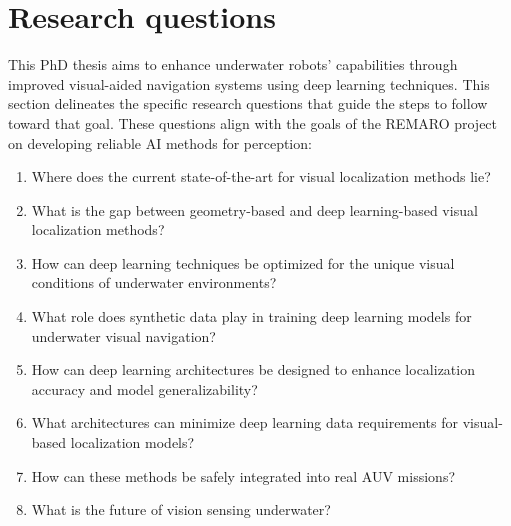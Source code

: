 \section{Research questions}
\label{sec:intro:researchquestions}

This PhD thesis aims to enhance underwater robots' capabilities through improved visual-aided navigation systems using deep learning techniques. This section delineates the specific research questions that guide the steps to follow toward that goal. These questions align with the goals of the REMARO project on developing reliable AI methods for perception:
\begin{enumerate}
    \item Where does the current state-of-the-art for visual localization methods lie?
    \item What is the gap between geometry-based and deep learning-based visual localization methods?
    \item How can deep learning techniques be optimized for the unique visual conditions of underwater environments?
    \item What role does synthetic data play in training deep learning models for underwater visual navigation?
    \item How can deep learning architectures be designed to enhance localization accuracy and model generalizability?
    \item What architectures can minimize deep learning data requirements for visual-based localization models?
    \item How can these methods be safely integrated into real AUV missions?
    \item What is the future of vision sensing underwater?

\end{enumerate}

    

    

    
    

    